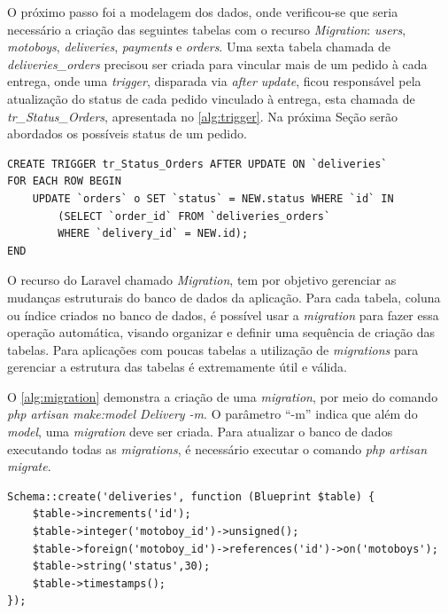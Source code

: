 O próximo passo foi a modelagem dos dados, onde verificou-se que seria necessário a criação das seguintes tabelas com o recurso \textit{Migration}: \textit{users}, \textit{motoboys}, \textit{deliveries}, \textit{payments} e \textit{orders}. Uma sexta tabela chamada de \textit{deliveries\_orders} precisou ser criada para vincular mais de um pedido à cada entrega, onde uma \textit{trigger}, disparada via \textit{after update}, ficou responsável pela atualização do status de cada pedido vinculado à entrega, esta chamada de \textit{tr\_Status\_Orders}, apresentada no \autoref{alg:trigger}. Na próxima Seção serão abordados os possíveis status de um pedido.

\begin{lstlisting}[caption={Delivery Routes - Trigger tr\_Status\_Orders}, label=alg:trigger, style=SQL]
CREATE TRIGGER tr_Status_Orders AFTER UPDATE ON `deliveries`
FOR EACH ROW BEGIN
    UPDATE `orders` o SET `status` = NEW.status WHERE `id` IN
        (SELECT `order_id` FROM `deliveries_orders`
        WHERE `delivery_id` = NEW.id); 
END
\end{lstlisting}

O recurso do Laravel chamado \textit{Migration}, tem por objetivo gerenciar as mudanças estruturais do banco de dados da aplicação. Para cada tabela, coluna ou índice criados no banco de dados, é possível usar a \textit{migration} para fazer essa operação automática, visando organizar e definir uma sequência de criação das tabelas. Para aplicações com poucas tabelas a utilização de \textit{migrations} para gerenciar a estrutura das tabelas é extremamente útil e válida.

O \autoref{alg:migration} demonstra a criação de uma \textit{migration}, por meio do comando \textit{php artisan make:model Delivery -m}. O parâmetro “-m” indica que além do \textit{model}, uma \textit{migration} deve ser criada.
Para atualizar o banco de dados executando todas as \textit{migrations}, é necessário executar o comando \textit{php artisan migrate}. 

\begin{lstlisting}[caption={Delivery Routes - Exemplo de migration}, style=htmlcssjs, label=alg:migration]
 Schema::create('deliveries', function (Blueprint $table) {
    $table->increments('id');
    $table->integer('motoboy_id')->unsigned();
    $table->foreign('motoboy_id')->references('id')->on('motoboys');
    $table->string('status',30);
    $table->timestamps();
});
\end{lstlisting}

